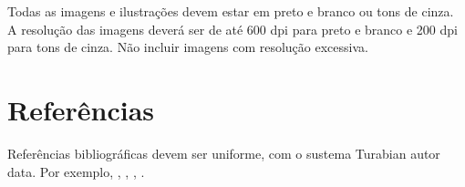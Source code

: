 \documentclass[12pt]{article}
\begin{document}
Todas as imagens e ilustrações devem estar em preto e branco ou tons
de cinza. A resolução das imagens deverá ser de até 600 dpi para preto
e branco e 200 dpi para tons de cinza. Não incluir imagens com
resolução excessiva.

\section{Referências}

Referências bibliográficas devem ser uniforme, com o sustema Turabian
autor data. Por exemplo, \cite{kroger04:desenvolvendo},
\cite{babbitt61:set}, \cite{coutinho.ea05:computational},
\cite{morris87:composition}.



\end{document}
